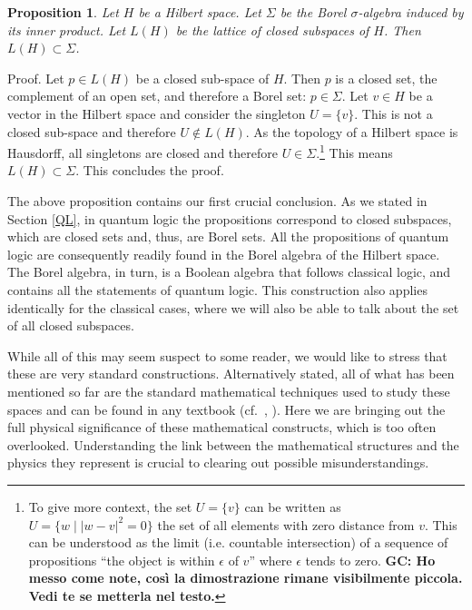 \documentclass[11pt, executivepaper]{article}
\newtheorem{prop}{Proposition}
\begin{document}
\begin{prop}
	Let $H$ be a Hilbert space. Let $\Sigma$ be the Borel $\sigma$-algebra induced by its inner product. Let $L(H)$ be the lattice of closed subspaces of $H$. Then $L(H) \subset \Sigma$.
\end{prop}

Proof. Let $p \in L(H)$ be a closed sub-space of $H$. Then $p$ is a closed set, the complement of an open set, and therefore a Borel set: $p \in \Sigma$. Let $v \in H$ be a vector in the Hilbert space and consider the singleton $U = \{ v \}$. This is not a closed sub-space and therefore $U \notin L(H)$. As the topology of a Hilbert space is Hausdorff, all singletons are closed and therefore $U \in \Sigma$.\footnote{To give more context, the set $U = \{ v \}$ can be written as $U = \{w \; | \; |w - v|^2 = 0\}$ the set of all elements with zero distance from $v$. This can be understood as the limit (i.e. countable intersection) of a sequence of propositions ``the object is within $\epsilon$ of $v$'' where $\epsilon$ tends to zero. \textbf{GC: Ho messo come note, cos\`i la dimostrazione rimane visibilmente piccola. Vedi te se metterla nel testo.} } This means $L(H) \subset \Sigma$. This concludes the proof.

The above proposition contains our first crucial conclusion. As we stated in Section \ref{QL}, in quantum logic the propositions correspond to closed subspaces, which are closed sets and, thus, are Borel sets. All the propositions of quantum logic are consequently readily found in the Borel algebra of the Hilbert space. The Borel algebra, in turn, is a Boolean algebra that follows classical logic, and contains all the statements of quantum logic. This construction also applies identically for the classical cases, where we will also be able to talk about the set of all closed subspaces.

While all of this may seem suspect to some reader, we would like to stress that these are very standard constructions. Alternatively stated, all of what has been mentioned so far are the standard mathematical techniques used to study these spaces and can be found in any textbook (cf.\ \cite{Rudin:1991}, \cite{Vasudeva:2017}). Here we are bringing out the full physical significance of these mathematical constructs, which is too often overlooked. Understanding the link between the mathematical structures and the physics they represent is crucial to clearing out possible misunderstandings.
\end{document}
